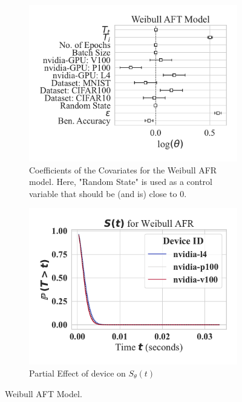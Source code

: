 \documentclass[conference]{IEEEtran}
\begin{document}
\begin{figure}[h!]
    \centering
    \captionsetup[subfigure]{skip=0pt} %
    \begin{subfigure}[b]{\linewidth}
        \centering
        \includegraphics[width=.6\linewidth,clip]{plots/combined/weibull_aft.pdf}
        \caption{Coefficients of the Covariates for the Weibull AFR model. Here, "Random State" is used as a control variable that should be (and is) close to 0.}
        \label{fig:aft}
    \end{subfigure}
    \begin{subfigure}[b]{\linewidth}
        \centering
        \includegraphics[width=.6\linewidth,clip]{plots/combined/weibull_device_num_partial_effect.pdf}
        \caption{Partial Effect  of device on $S_{\theta}(t)$ }
        \label{fig:partial}
    \end{subfigure}
    \caption{Weibull AFT Model.}
\end{figure}
\end{document}
